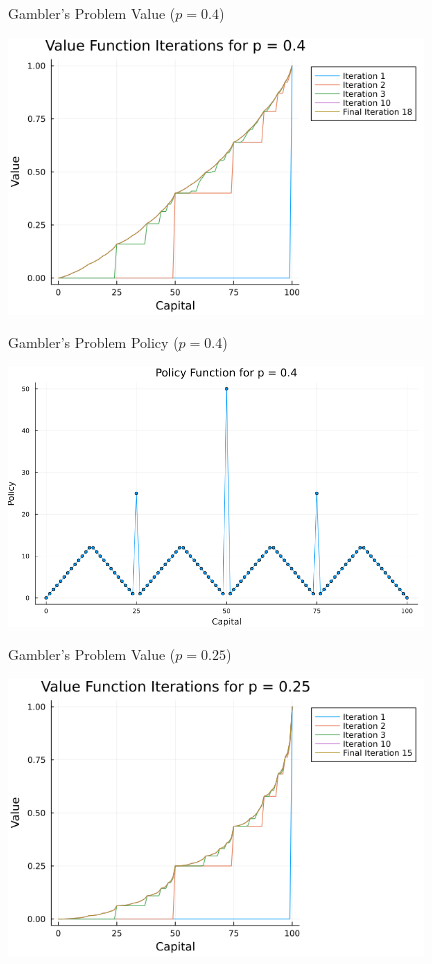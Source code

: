 \documentclass{beamer}
\begin{document}
\begin{frame}{Gambler's Problem Value ($p = 0.4$)}
\begin{center}
	\includegraphics[width=11cm]{gamblers_problem_value_p04.png}
		\end{center}
\end{frame}
\begin{frame}{Gambler's Problem Policy ($p = 0.4$)}
\begin{center}
	\includegraphics[width=11cm]{gamblers_problem_policy_p04.png}
		\end{center}
\end{frame}
\begin{frame}{Gambler's Problem Value ($p = 0.25$)}
\begin{center}
	\includegraphics[width=11cm]{gamblers_problem_value_p025.png}
		\end{center}
\end{frame}
\end{document}
